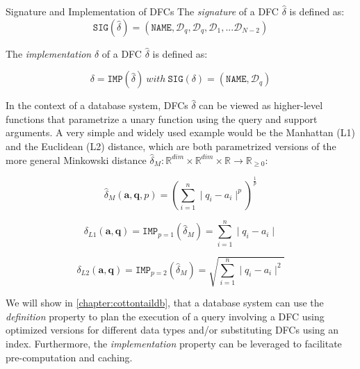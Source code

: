 \begin{definition}[label=definition:dfc_sig_imp]{Signature and Implementation of DFCs}{}    
    The \emph{signature} of a DFC $\hat{\delta}$ is defined as:
    \begin{equation}
        \label{equation:dfc_signature}
        \texttt{SIG}(\hat{\delta}) = (\mathtt{NAME}, \mathcal{D}_q, \mathcal{D}_q, \mathcal{D}_1,... \mathcal{D}_{N-2})
    \end{equation}

    The \emph{implementation} $\delta$ of a DFC $\hat{\delta}$ is defined as:

    \begin{equation}
        \label{equation:dfc_implementation}
        \delta = \texttt{IMP}(\hat{\delta}) \: with \: \texttt{SIG}(\delta) = (\mathtt{NAME}, \mathcal{D}_q)
    \end{equation}
\end{definition}


In the context of a database system, DFCs $\hat{\delta}$ can be viewed as higher-level functions that parametrize a unary function using the query and support arguments. A very simple and widely used example would be the Manhattan (L1) and the Euclidean (L2) distance, which are both parametrized versions of the more general Minkowski distance $\hat{\delta}_{M} \colon \mathbb{R}^{dim} \times \mathbb{R}^{dim} \times \mathbb{R} \to \mathbb{R}_{\geq 0}$:

\begin{equation}
    \hat{\delta}_{M}(\mathbf{a},\mathbf{q},p) = \left(\sum_{i=1}^{n} \mid q_i - a_i \mid^p\right)^{\frac{1}{p}}
\end{equation}

\begin{equation}
    \delta_{L1}(\mathbf{a},\mathbf{q}) = \texttt{IMP}_{p=1}(\hat{\delta}_M) = \sum_{i=1}^{n} \mid q_i - a_i \mid
\end{equation}

\begin{equation}
    \delta_{L2}(\mathbf{a},\mathbf{q}) = \texttt{IMP}_{p=2}(\hat{\delta}_M) = \sqrt{\sum_{i=1}^{n} \mid q_i - a_i \mid^2}
\end{equation}

We will show in \cref{chapter:cottontaildb}, that a database system can use the \emph{definition} property to plan the execution of a query involving a DFC using optimized versions for different data types and/or substituting DFCs using an index. Furthermore, the \emph{implementation} property can be leveraged to facilitate pre-computation and caching.
    

